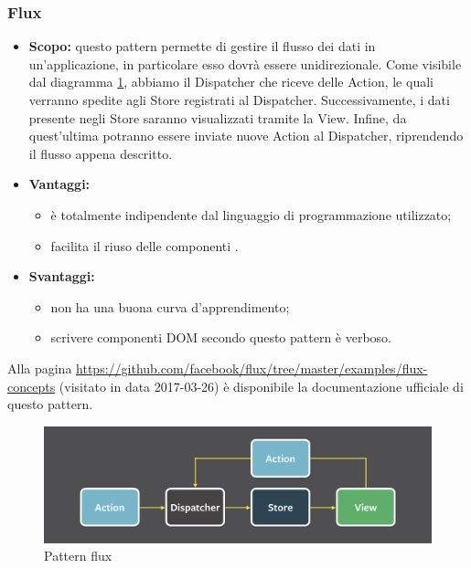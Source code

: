     \subsubsection{Flux}
    \begin{itemize}
    	\item \textbf{Scopo:} questo pattern permette di gestire il flusso dei dati in un'applicazione, in particolare esso dovrà essere unidirezionale. Come visibile dal diagramma \ref{fig:flux}, abbiamo il Dispatcher che riceve delle Action, le quali verranno spedite agli Store registrati al Dispatcher. Successivamente, i dati presente negli Store saranno visualizzati tramite la View. Infine, da quest'ultima potranno essere inviate nuove Action al Dispatcher, riprendendo il flusso appena descritto.
    	\item \textbf{Vantaggi:} 
    	\begin{itemize}
    		\item è totalmente indipendente dal linguaggio di programmazione utilizzato;
    		\item facilita il riuso delle componenti .
    	\end{itemize}
    	\item \textbf{Svantaggi:}
    	\begin{itemize}
    		\item non ha una buona curva d'apprendimento;
    		\item scrivere componenti DOM secondo questo pattern è verboso.
    	\end{itemize}
    \end{itemize}
    Alla pagina \url{https://github.com/facebook/flux/tree/master/examples/flux-concepts} (visitato in data 2017-03-26) è disponibile la documentazione ufficiale di questo pattern.
    \begin{figure}[h]
    	\centering
    	\includegraphics[width=\textwidth,height=\textheight,keepaspectratio]{images/fluxpattern.png}
    	\caption{Pattern flux}\label{fig:flux}
 
    \end{figure}
    \newpage
